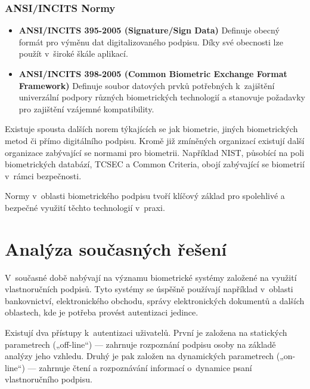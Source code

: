 \subsection*{ANSI/INCITS Normy}
\begin{itemize}
  \item \textbf{ANSI/INCITS 395-2005 (Signature/Sign Data)}  
  Definuje obecný formát pro výměnu dat digitalizovaného podpisu. Díky své obecnosti lze použít v~široké škále aplikací.~\cite{ANSI_INCITS_395_2005} %
  
  \item \textbf{ANSI/INCITS 398-2005 (Common Biometric Exchange Format Framework)}  
  Definuje soubor datových prvků potřebných k~zajištění univerzální podpory různých biometrických technologií a stanovuje požadavky pro zajištění vzájemné kompatibility.~\cite{DrahanskýMartin2011} %
\end{itemize}

Existuje spousta dalších norem týkajících se jak biometrie, jiných biometrických metod či přímo digitálního podpisu.                %
Kromě již zmíněných organizací existují další organizace zabývající se normami pro biometrii.                                      %
Například NIST, působící na poli biometrických databází, TCSEC a Common Criteria, obojí zabývající se biometrií v~rámci bezpečnosti.~\cite{DrahanskýMartin2011}%

Normy v~oblasti biometrického podpisu tvoří klíčový základ pro spolehlivé a bezpečné využití těchto technologií v~praxi.


\chapter{Analýza současných řešení}

V~současné době nabývají na významu biometrické systémy založené na využití vlastnoručních podpisů. 
Tyto systémy se úspěšně používají například v~oblasti bankovnictví, elektronického obchodu, správy elektronických dokumentů a dalších oblastech, kde je potřeba provést autentizaci jedince. 

Existují dva přístupy k~autentizaci uživatelů.
První je založena na statických parametrech („off-line“) --- zahrnuje rozpoznání podpisu osoby na základě analýzy jeho vzhledu.
Druhý je pak založen na dynamických parametrech („on-line“) --- zahrnuje čtení a rozpoznávání informací o~dynamice psaní vlastnoručního podpisu.~\cite{9306154} %

